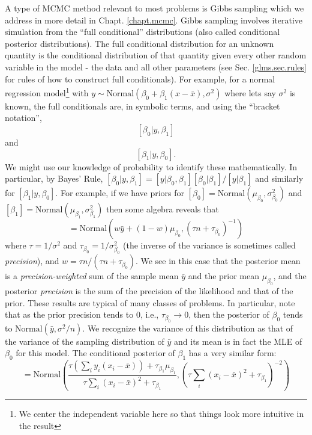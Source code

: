 A type of MCMC method relevant to most problems is Gibbs sampling 
\citep{geman_geman:1984} which we address in more detail in Chapt. \ref{chapt.mcmc}.
Gibbs sampling 
involves 
iterative simulation from the ``full
conditional'' 
distributions (also called conditional posterior
distributions). The full conditional distribution for an unknown
quantity is the conditional distribution of that quantity given every
other random variable in the model - the data and all other
parameters (see Sec. \ref{glms.sec.rules} for rules of how to construct full conditionals).
For example, for a normal regression model\footnote{We center the 
independent variable here so that things look more intuitive in the result} with $y \sim
\mbox{Normal}(\beta_0 + \beta_1 (x-\bar{x}) , \sigma^{2})$
where lets say $\sigma^{2}$ is known, the full conditionals are, in
symbolic terms, and using the ``bracket notation'',
\[
[\beta_0|y,\beta_1]
\]
 and
\[
[\beta_1|y,\beta_0].
\]
We might use our knowledge of probability to identify these
mathematically. In particular, by Bayes' Rule, $[\beta_0|y,\beta_1] =
[y|\beta_0,\beta_1][\beta_0|\beta_1]/[y|\beta_1]$ and similarly for
$[\beta_1|y,\beta_0]$. For example, if we have priors for 
$[\beta_0] = \mbox{Normal}(\mu_{\beta_0}, \sigma^{2}_{\beta_0})$ 
and 
$[\beta_1] = \mbox{Normal}(\mu_{\beta_1}, \sigma^{2}_{\beta_1})$ then
some algebra reveals that 
\begin{equation}
[\beta_0|y,\beta_1] = \mbox{Normal}\left(w \bar{y} + (1-w)\mu_{\beta_0},
(\tau n + \tau_{\beta_0})^{-1} \right)
\label{glms.eq.alpha}
\end{equation}
where $\tau = 1/\sigma^{2}$ and $\tau_{\beta_0} = 1/\sigma^{2}_{\beta_0}$
(the inverse of the variance is sometimes called {\it precision}), and
$w = \tau n/(\tau n + \tau_{\beta_0})$. We see in this case that the
posterior mean is a {\it precision-weighted} sum of the sample mean
$\bar{y}$ and the prior mean $\mu_{\beta_0}$, and the posterior {\it precision} 
is the sum of the precision of the likelihood and that of the
prior. These results are typical of many
classes of problems. In particular, note that as the prior precision
tends to 0, i.e., $\tau_{\beta_0} \rightarrow 0$, then the posterior of
$\beta_0$ tends to  $\mbox{Normal}(\bar{y}, \sigma^{2}/n)$. We recognize the 
variance of this distribution as that of the variance of the sampling
distribution of $\bar{y}$ and its mean is in fact the MLE of $\beta_0$
for this model. 
The conditional posterior of $\beta_1$ has a very similar form:
\begin{equation}
 [\beta_1|y,\beta_0]  = \mbox{Normal}\left(
\frac{ \tau (\sum_{i} y_{i}(x_{i}-\bar{x}) ) + \tau_{\beta_1} \mu_{\beta_1}}
{ \tau \sum_{i} (x_{i}-\bar{x})^{2} + \tau_{\beta_1}},
(\tau \sum_{i} (x_{i}-\bar{x})^{2} + \tau_{\beta_1} )^{-2} \right)
\label{glms.eq.beta}
\end{equation}
